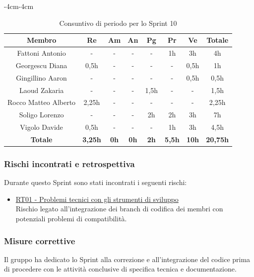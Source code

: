 \documentclass[a4paper,12pt]{article}
\begin{document}
    \begin{table}[H]
    \begin{adjustwidth}{-4cm}{-4cm}
    \centering
    \begin{tabular}{|c|c|c|c|c|c|c|c|}
        \hline
        \textbf{Membro} & \textbf{Re} & \textbf{Am} & \textbf{An} & \textbf{Pg} & \textbf{Pr} & \textbf{Ve} & \textbf{Totale} \\
        \hline
        Fattoni Antonio & - & - & - & - & 1h & 3h & 4h \\
        \hline
        Georgescu Diana & 0,5h & - & - & - & - & 0,5h & 1h \\
        \hline
        Gingillino Aaron & - & - & - & - & - & 0,5h & 0,5h \\
        \hline
        Laoud Zakaria & - & - & - & 1,5h & - & - & 1,5h \\
        \hline
        Rocco Matteo Alberto & 2,25h & - & - & - & - & - & 2,25h \\
        \hline
        Soligo Lorenzo & - & - & - & 2h & 2h & 3h & 7h \\
        \hline
        Vigolo Davide & 0,5h & - & - & - & 1h & 3h & 4,5h \\
        \hline
          \textbf{Totale} & \textbf{3,25h} & \textbf{0h} & \textbf{0h} & \textbf{2h} & \textbf{5,5h} & \textbf{10h} & \textbf{20,75h} \\
        \hline
    \end{tabular}
    \caption{Consuntivo di periodo per lo Sprint 10}
    \end{adjustwidth}
\end{table}

\subsubsection{Rischi incontrati e retrospettiva}
Durante questo Sprint sono stati incontrati i seguenti rischi:
\begin{itemize}
    \item \hyperref[RT01]{RT01 - Problemi tecnici con gli strumenti di sviluppo} \\Rischio legato all'integrazione dei branch di codifica dei membri con potenziali problemi di compatibilità.
\end{itemize}

\subsubsection{Misure correttive}
Il gruppo ha dedicato lo Sprint alla correzione e all'integrazione del codice prima di procedere con le attività conclusive di specifica tecnica e documentazione.
\end{document}
